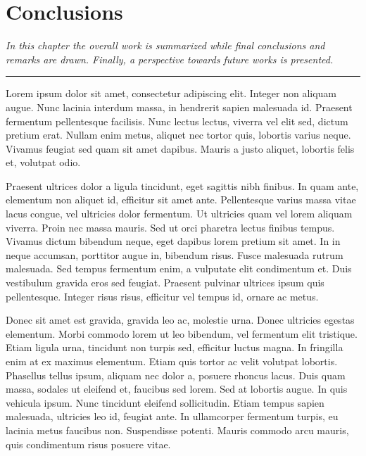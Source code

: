 \chapter{Conclusions}\label{ch:conclusions}
\textit{In this chapter the overall work is summarized while final conclusions and remarks are drawn. Finally, a perspective towards future works is presented.}
\vspace{0.25cm}
\par\fancybreak{$***$}\par
\vspace{0.35cm}

Lorem ipsum dolor sit amet, consectetur adipiscing elit. Integer non aliquam augue. Nunc lacinia interdum massa, in hendrerit sapien malesuada id. Praesent fermentum pellentesque facilisis. Nunc lectus lectus, viverra vel elit sed, dictum pretium erat. Nullam enim metus, aliquet nec tortor quis, lobortis varius neque. Vivamus feugiat sed quam sit amet dapibus. Mauris a justo aliquet, lobortis felis et, volutpat odio.

Praesent ultrices dolor a ligula tincidunt, eget sagittis nibh finibus. In quam ante, elementum non aliquet id, efficitur sit amet ante. Pellentesque varius massa vitae lacus congue, vel ultricies dolor fermentum. Ut ultricies quam vel lorem aliquam viverra. Proin nec massa mauris. Sed ut orci pharetra lectus finibus tempus. Vivamus dictum bibendum neque, eget dapibus lorem pretium sit amet. In in neque accumsan, porttitor augue in, bibendum risus. Fusce malesuada rutrum malesuada. Sed tempus fermentum enim, a vulputate elit condimentum et. Duis vestibulum gravida eros sed feugiat. Praesent pulvinar ultrices ipsum quis pellentesque. Integer risus risus, efficitur vel tempus id, ornare ac metus.

Donec sit amet est gravida, gravida leo ac, molestie urna. Donec ultricies egestas elementum. Morbi commodo lorem ut leo bibendum, vel fermentum elit tristique. Etiam ligula urna, tincidunt non turpis sed, efficitur luctus magna. In fringilla enim at ex maximus elementum. Etiam quis tortor ac velit volutpat lobortis. Phasellus tellus ipsum, aliquam nec dolor a, posuere rhoncus lacus. Duis quam massa, sodales ut eleifend et, faucibus sed lorem. Sed at lobortis augue. In quis vehicula ipsum. Nunc tincidunt eleifend sollicitudin. Etiam tempus sapien malesuada, ultricies leo id, feugiat ante. In ullamcorper fermentum turpis, eu lacinia metus faucibus non. Suspendisse potenti. Mauris commodo arcu mauris, quis condimentum risus posuere vitae.

